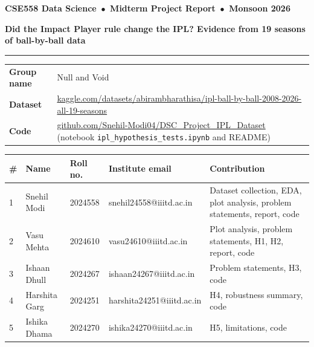 \documentclass[10pt,a4paper]{article}
\begin{document}
{\small\bfseries CSE558 Data Science \,$\bullet$\, Midterm Project Report \,$\bullet$\, Monsoon 2026}\par\vspace{6pt}
{\LARGE\bfseries Did the Impact Player rule change the IPL? Evidence from 19 seasons of ball-by-ball data}\par
\vspace{8pt}\hrule\vspace{6pt}

{\small
\begin{tabularx}{\textwidth}{@{}>{\bfseries}p{2.3cm}L@{}}
Group name & Null and Void\\
Dataset & \href{https://www.kaggle.com/datasets/abirambharathisa/ipl-ball-by-ball-2008-2026-all-19-seasons}{kaggle.com/datasets/abirambharathisa/ipl-ball-by-ball-2008-2026-all-19-seasons}\\
Code & \href{https://github.com/Snehil-Modi04/DSC_Project_IPL_Dataset}{github.com/Snehil-Modi04/DSC\_Project\_IPL\_Dataset} (notebook \texttt{ipl\_hypothesis\_tests.ipynb} and README)\\
\end{tabularx}

\vspace{4pt}
\begin{tabularx}{\textwidth}{@{}p{0.3cm}p{2.6cm}p{1.5cm}p{4.0cm}L@{}}
\toprule
\textbf{\#} & \textbf{Name} & \textbf{Roll no.} & \textbf{Institute email} & \textbf{Contribution}\\
 & Snehil Modi & 2024558 & snehil24558@iiitd.ac.in & Dataset collection, EDA, plot analysis, problem statements, report, code\\
2 & Vasu Mehta & 2024610 & vasu24610@iiitd.ac.in & Plot analysis, problem statements, H1, H2, report, code\\
3 & Ishaan Dhull & 2024267 & ishaan24267@iiitd.ac.in & Problem statements, H3, code\\
4 & Harshita Garg & 2024251 & harshita24251@iiitd.ac.in & H4, robustness summary, code\\
5 & Ishika Dhama & 2024270 & ishika24270@iiitd.ac.in & H5, limitations, code\\
\bottomrule
\end{tabularx}}
\end{document}

